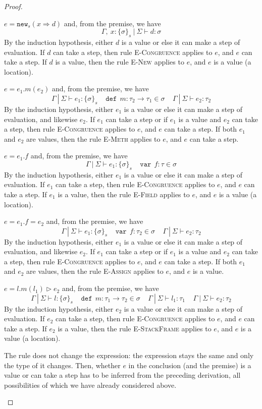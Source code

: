 \documentclass{llncs}
\newcommand{\keywadj}[1]{\mathtt{#1}}
\newcommand{\keyw}[1]{\keywadj{#1}~}
\newcommand{\pcase}[1][]{
  \if\relax\detokenize{#1}\relax
    \def\thiscase{}
  \else
    \def\thiscase{~#1}
  \fi
  \item
}
\begin{document}
\begin{proof}
\begin{pcases}
\pcase[\textsc{T-New}]
$e = \keywadj{new}_{s}(x \Rightarrow d)$ and, from the premise, we have
\[
\Gamma,~x : \{ \sigma \}_{s}~|~\Sigma \vdash d : \sigma
\]
By the induction hypothesis, either $d$ is a value or else it can make a step of evaluation. If $d$ can take a step, then rule \textsc{E-Congruence} applies to $e$, and $e$ can take a step. If $d$ is a value, then the rule \textsc{E-New} applies to $e$, and $e$ is a value (a location).
\\
\pcase[\textsc{T-Meth}]
$e = e_1.m(e_2)$ and, from the premise, we have
\[
\Gamma~|~\Sigma \vdash e_1 : \{\sigma\}_s~~~~~\keyw{def}~ m : \tau_2 \rightarrow \tau_1 \in \sigma~~~~~\Gamma~|~\Sigma \vdash e_2 : \tau_2
\]
By the induction hypothesis, either $e_1$ is a value or else it can make a step of evaluation, and likewise $e_2$. If $e_1$ can take a step or if $e_1$ is a value and $e_2$ can take a step, then rule \textsc{E-Congruence} applies to $e$, and $e$ can take a step. If both $e_1$ and $e_2$ are values, then the rule \textsc{E-Meth} applies to $e$, and $e$ can take a step.
\\
\pcase[\textsc{T-Field}]
$e = e_1.f$ and, from the premise, we have
\[
\Gamma~|~\Sigma \vdash e_1 : \{\sigma\}_s~~~~~\keyw{var}~ f : \tau \in \sigma
\]
By the induction hypothesis, either $e_1$ is a value or else it can make a step of evaluation. If $e_1$ can take a step, then rule \textsc{E-Congruence} applies to $e$, and $e$ can take a step. If $e_1$ is a value, then the rule \textsc{E-Field} applies to $e$, and $e$ is a value (a location).
\\
\pcase[\textsc{T-Assign}]
$e = e_1.f=e_2$ and, from the premise, we have
\[
\Gamma~|~\Sigma \vdash e_1 : \{\sigma\}_s~~~~~\keyw{var}~ f:\tau_2 \in \sigma~~~~~\Gamma~|~\Sigma \vdash e_2 : \tau_2
\]
By the induction hypothesis, either $e_1$ is a value or else it can make a step of evaluation, and likewise $e_2$. If $e_1$ can take a step or if $e_1$ is a value and $e_2$ can take a step, then rule \textsc{E-Congruence} applies to $e$, and $e$ can take a step. If both $e_1$ and $e_2$ are values, then the rule \textsc{E-Assign} applies to $e$, and $e$ is a value.
\\
\pcase[\textsc{T-StackFrame}]
$e = l.m(l_1) \rhd e_2$ and, from the premise, we have
\[
\Gamma~|~\Sigma \vdash l : \{\sigma\}_s~~~~~\keyw{def}~ m : \tau_1 \rightarrow \tau_2 \in \sigma~~~~~\Gamma~|~\Sigma \vdash l_1 : \tau_1~~~~~\Gamma~|~\Sigma \vdash e_2 : \tau_2
\]
By the induction hypothesis, either $e_2$ is a value or else it can make a step of evaluation. If $e_2$ can take a step, then rule \textsc{E-Congruence} applies to $e$, and $e$ can take a step. If $e_2$ is a value, then the rule \textsc{E-StackFrame} applies to $e$, and $e$ is a value (a location).
\\
\pcase[\textsc{T-Sub}]
The rule does not change the expression: the expression stays the same and only the type of it changes. Then, whether $e$ in the conclusion (and the premise) is a value or can take a step has to be inferred from the preceding derivation, all possibilities of which we have already considered above.


\end{pcases}
\end{proof}
\end{document}
